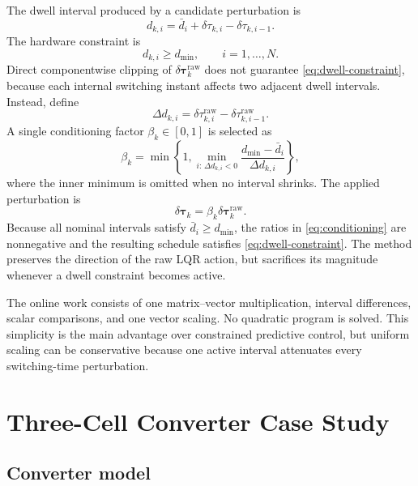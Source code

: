 \documentclass[11pt]{article}
\newcommand{\vect}[1]{\bm{#1}}
\newcommand{\dtau}{\delta\vect{\tau}}
\begin{document}
The dwell interval produced by a candidate perturbation is
\begin{equation}
    d_{k,i}=\bar d_i+\delta\tau_{k,i}-\delta\tau_{k,i-1}.
    \label{eq:dwell}
\end{equation}
The hardware constraint is
\begin{equation}
    d_{k,i}\ge d_{\min},\qquad i=1,\ldots,N.
    \label{eq:dwell-constraint}
\end{equation}
Direct componentwise clipping of $\dtau_k^{\mathrm{raw}}$ does not guarantee \eqref{eq:dwell-constraint}, because each internal switching instant affects two adjacent dwell intervals. Instead, define
\begin{equation}
    \Delta d_{k,i}
    =\delta\tau_{k,i}^{\mathrm{raw}}
    -\delta\tau_{k,i-1}^{\mathrm{raw}}.
\end{equation}
A single conditioning factor $\beta_k\in[0,1]$ is selected as
\begin{equation}
\beta_k=
\min\!\left\{
1,
\min_{i:\,\Delta d_{k,i}<0}
\frac{d_{\min}-\bar d_i}{\Delta d_{k,i}}
\right\},
\label{eq:conditioning}
\end{equation}
where the inner minimum is omitted when no interval shrinks. The applied perturbation is
\begin{equation}
    \dtau_k=\beta_k\dtau_k^{\mathrm{raw}}.
    \label{eq:conditioned-control}
\end{equation}
Because all nominal intervals satisfy $\bar d_i\ge d_{\min}$, the ratios in \eqref{eq:conditioning} are nonnegative and the resulting schedule satisfies \eqref{eq:dwell-constraint}. The method preserves the direction of the raw LQR action, but sacrifices its magnitude whenever a dwell constraint becomes active.

The online work consists of one matrix--vector multiplication, interval differences, scalar comparisons, and one vector scaling. No quadratic program is solved. This simplicity is the main advantage over constrained predictive control, but uniform scaling can be conservative because one active interval attenuates every switching-time perturbation.

\section{Three-Cell Converter Case Study}
\label{sec:case-study}

\subsection{Converter model}
\end{document}
